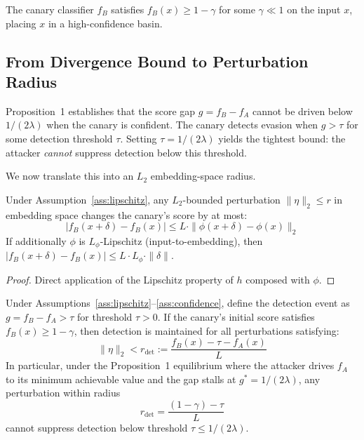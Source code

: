 \begin{assumption}
\label{ass:confidence}
The canary classifier $f_B$ satisfies $f_B(x) \geq 1 - \gamma$ for some $\gamma \ll 1$ on the input $x$, placing $x$ in a high-confidence basin.
\end{assumption}

\subsection{From Divergence Bound to Perturbation Radius}

Proposition~1 establishes that the score gap $g = f_B - f_A$ cannot be driven below $1/(2\lambda)$ when the canary is confident. The canary detects evasion when $g > \tau$ for some detection threshold $\tau$. Setting $\tau = 1/(2\lambda)$ yields the tightest bound: the attacker \emph{cannot} suppress detection below this threshold.

We now translate this into an $L_2$ embedding-space radius.

\begin{lemma}
\label{lem:score-perturbation}
Under Assumption~\ref{ass:lipschitz}, any $L_2$-bounded perturbation $\|\eta\|_2 \leq r$ in embedding space changes the canary's score by at most:
\[
|f_B(x + \delta) - f_B(x)| \leq L \cdot \|\phi(x + \delta) - \phi(x)\|_2
\]
If additionally $\phi$ is $L_\phi$-Lipschitz (input-to-embedding), then $|f_B(x+\delta) - f_B(x)| \leq L \cdot L_\phi \cdot \|\delta\|$.
\end{lemma}

\begin{proof}
Direct application of the Lipschitz property of $h$ composed with $\phi$.
\end{proof}

\begin{theorem}
\label{thm:deterministic-radius}
Under Assumptions~\ref{ass:lipschitz}--\ref{ass:confidence}, define the detection event as $g = f_B - f_A > \tau$ for threshold $\tau > 0$. If the canary's initial score satisfies $f_B(x) \geq 1 - \gamma$, then detection is maintained for all perturbations satisfying:
\[
\|\eta\|_2 < r_{\text{det}} := \frac{f_B(x) - \tau - f_A(x)}{L}
\]
In particular, under the Proposition~1 equilibrium where the attacker drives $f_A$ to its minimum achievable value and the gap stalls at $g^* = 1/(2\lambda)$, any perturbation within radius
\[
r_{\text{det}} = \frac{(1 - \gamma) - \tau}{L}
\]
cannot suppress detection below threshold $\tau \leq 1/(2\lambda)$.
\end{theorem}

